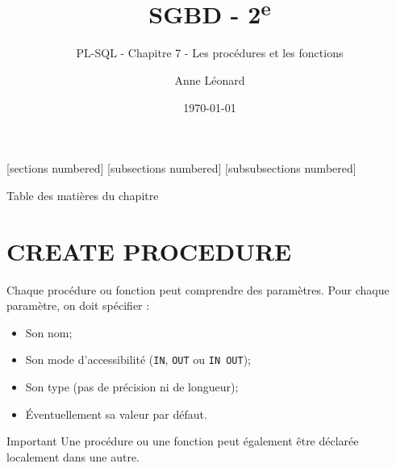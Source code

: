 \documentclass[10pt]{beamer}
\title{SGBD - 2\textsuperscript{e}}
\subtitle{PL-SQL - Chapitre 7 - Les procédures et les fonctions}
\date{\today}
\author{Anne Léonard}
\institute{Haute École de la Province de Liège}
\begin{document}
\maketitle


[sections numbered]
[subsections numbered]
[subsubsections numbered]
\begin{frame}[allowframebreaks]{Table des matières du chapitre}
    \tableofcontents[subsectionstyle=show/show/hide,subsubsectionstyle=show/show/hide,]
\end{frame}

\section{CREATE PROCEDURE}
\begin{frame}{\secname}
    
\end{frame}


\begin{frame}{\secname}
    Chaque procédure ou fonction peut comprendre des paramètres. Pour chaque paramètre, on doit spécifier :
    \begin{itemize}
        \item Son nom;
        \item Son mode d'accessibilité (\lstinline[language=plsql]!IN!, \lstinline[language=plsql]!OUT! ou \lstinline[language=plsql]!IN OUT!);
        \item Son type (pas de précision ni de longueur);
        \item Éventuellement sa valeur par défaut.
    \end{itemize}
\end{frame}

\begin{frame}{\secname}
    
\end{frame}

\begin{frame}{\secname}
    \begin{alertblock}{Important}
        Une procédure ou une fonction peut également être déclarée localement dans une autre.
    \end{alertblock}
\end{frame}
\end{document}
